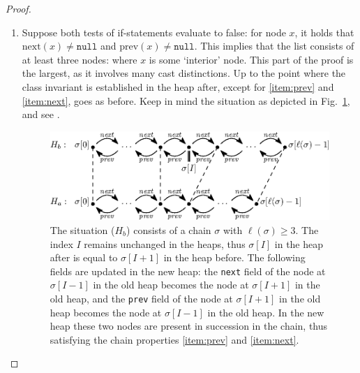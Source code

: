 \documentclass[runningheads]{llncs}
\theoremstyle{remark}
\begin{document}
\begin{proof}
\begin{enumerate}
    \item Suppose both tests of if-statements evaluate to false: for node $x$, it holds that $\mathrm{next}(x)\neq\mathtt{null}$ and $\mathrm{prev}(x)\neq\mathtt{null}$. This implies that the list consists of at least three nodes: where $x$ is some `interior' node. This part of the proof is the largest, as it involves many cast distinctions. Up to the point where the class invariant is established in the heap after, except for \ref{item:prev} and \ref{item:next}, goes as before. Keep in mind the situation as depicted in Fig.~\ref{fig:unlink-middle}, and see .
    
\begin{figure}
   \centering
   \includegraphics[scale=1]{figures/linkedlist-unlink-middle.eps}
   \caption{The situation ($H_b$) consists of a chain $\sigma$ with $\ell(\sigma)\geq 3$. The index $I$ remains unchanged in the heaps, thus $\sigma[I]$ in the heap after is equal to $\sigma[I+1]$ in the heap before. The following fields are updated in the new heap: the \texttt{next} field of the node at $\sigma[I-1]$ in the old heap becomes the node at $\sigma[I+1]$ in the old heap, and the \texttt{prev} field of the node at $\sigma[I+1]$ in the old heap becomes the node at $\sigma[I-1]$ in the old heap. In the new heap these two nodes are present in succession in the chain, thus satisfying the chain properties \ref{item:prev} and \ref{item:next}.}
   \vspace*{-12pt}
   \label{fig:unlink-middle}
\end{figure}


\end{enumerate}
\end{proof}
\end{document}
